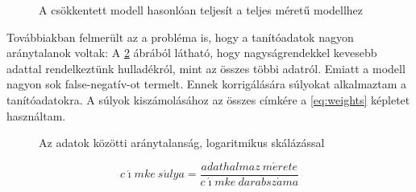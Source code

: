 \begin{figure}[H]
	\centering
	\hspace{5pt}
	\hspace{5pt}
	\caption{A csökkentett modell hasonlóan teljesít a teljes méretű modellhez}
	\label{fig:fullsize-vs-reduced}
\end{figure}

Továbbiakban felmerült az a probléma is, hogy a tanítóadatok nagyon aránytalanok voltak: A \ref{fig:unbalanced-data} ábrából látható, hogy nagyságrendekkel kevesebb adattal rendelkeztünk hulladékról, mint az összes többi adatról. Emiatt a modell nagyon sok false-negatív-ot termelt. Ennek korrigálására súlyokat alkalmaztam a tanítóadatokra. A súlyok kiszámolásához az összes címkére a \ref{eq:weights} képletet használtam.

\datacounts

\begin{figure}
    \caption{Az adatok közötti aránytalanság, logaritmikus skálázással}
    \label{fig:unbalanced-data}
\end{figure}

\begin{equation}\label{eq:weights}
    c\acute{\imath}mke \ s\acute{u}lya=\frac{adathalmaz \ m\acute{e}rete}{c\acute{\imath}mke \ darabsz\acute{a}ma}
\end{equation}

